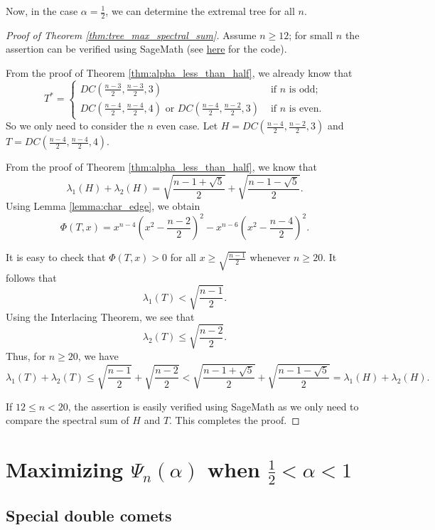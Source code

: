 \documentclass[11pt]{article}
\theoremstyle{plain}
\numberwithin{equation}{section}
\begin{document}
Now, in the case $\alpha = \frac{1}{2}$, we can determine the extremal tree for all $n$. 

\begin{proof}[Proof of Theorem \ref{thm:tree_max_spectral_sum}] Assume $n\ge 12$; for small $n$ the assertion can be verified using SageMath (see \href{https://github.com/Shivaramkratos/Codes_misc/blob/main/convex_sum_specific_check.sage}{here} for the code).

From the proof of Theorem \ref{thm:alpha_less_than_half}, we already know that 
\[ T^* = 
\begin{cases}
  DC(\frac{n-3}{2},\frac{n-3}{2}, 3) & \text{ if }n \text{ is odd};\\
  DC(\frac{n-4}{2}, \frac{n-4}{2}, 4) \text{ or } DC(\frac{n-4}{2}, \frac{n-2}{2}, 3) & \text{ if } n \text{ is even}. 
\end{cases} \]
So we only need to consider the $n$ even case. Let $H = DC(\frac{n-4}{2}, \frac{n-2}{2}, 3)$ and $T =  DC(\frac{n-4}{2}, \frac{n-4}{2}, 4)$. 

From the proof of Theorem \ref{thm:alpha_less_than_half}, we know that 
\[ \lambda_1(H) + \lambda_2(H) = \sqrt{\frac{n-1+\sqrt{5}}{2}} + \sqrt{\frac{n-1-\sqrt{5}}{2}}. \]
Using Lemma \ref{lemma:char_edge}, we obtain 
\[\Phi(T, x) = x^{n-4}\left( x^2 - \frac{n-2}{2}\right)^2 - x^{n-6}\left( x^2 - \frac{n-4}{2}\right)^2.\]

It is easy to check that $\Phi(T, x)> 0$ for all $x\ge \sqrt{\frac{n-1}{2}}$ whenever $n\ge 20$. It follows that 
\[\lambda_1(T) < \sqrt{\frac{n-1}{2}}.\] Using the Interlacing Theorem, we see that
 \[ \lambda_2(T)\le \sqrt{\frac{n-2}{2}}.\]
Thus, for $n\ge 20$, we have
\[ \lambda_1(T) + \lambda_2(T) \le \sqrt{\frac{n-1}{2}} + \sqrt{\frac{n-2}{2}} < \sqrt{\frac{n-1+\sqrt{5}}{2}} + \sqrt{\frac{n-1-\sqrt{5}}{2}} = \lambda_1(H) + \lambda_2(H).\]

If $12\le n<20$, the assertion is easily verified using SageMath as we only need to compare the spectral sum of $H$ and $T$. This completes the proof. 
\end{proof}

\section{Maximizing $\Psi_n(\alpha)$ when $\frac{1}{2} < \alpha < 1$}
\label{section:convex_combination_alpha_more_than_half}

\subsection{Special double comets}
\end{document}
